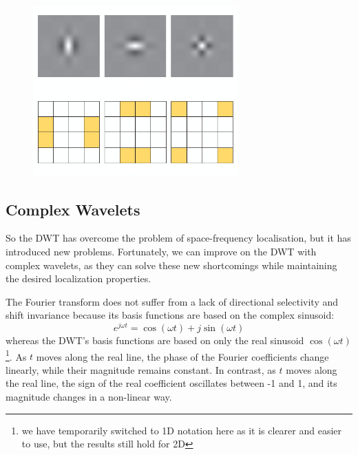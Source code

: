   \begin{figure}
    \centering
    \includegraphics[width=0.7\textwidth]{litreview/images/dwt_wavelets.png}
      \label{fig:dwt_wavelets}
  \end{figure}

\subsection{Complex Wavelets}\label{sec:complex_wavelets}
  So the DWT has overcome the problem of space-frequency localisation, but it
  has introduced new problems.  Fortunately, we can improve on the DWT with
  complex wavelets, as they can solve these new shortcomings while maintaining
  the desired localization properties. 
  
  The Fourier transform does not suffer from a lack of directional selectivity
  and shift invariance because its basis functions are based on the complex
  sinusoid: 
  \begin{equation} 
    e^{j\omega t} = \cos(\omega t) + j\sin(\omega t)
  \end{equation} 
  whereas the DWT's basis functions are based on only the real
  sinusoid $\cos(\omega t)$\footnote{we have temporarily switched to 1D
  notation here as it is clearer and easier to use, but the results still hold
  for 2D}. As $t$ moves along the real line, the phase of the
  Fourier coefficients change linearly, while their magnitude remains constant. In
  contrast, as $t$ moves along the real line, the sign of the real coefficient
  oscillates between -1 and 1, and its magnitude changes in a non-linear way.

